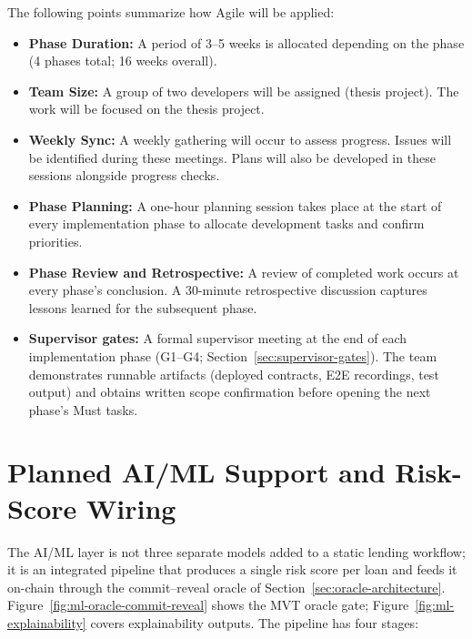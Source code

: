 \documentclass[12pt,a4paper]{report}
\begin{document}
The following points summarize how Agile will be applied:
\begin{itemize}[noitemsep]
\item \textbf{Phase Duration:} A period of 3--5 weeks is allocated depending on the phase (4 phases total; 16 weeks overall).
\item \textbf{Team Size:} A group of two developers will be assigned (thesis project). The work will be focused on the thesis project.
\item \textbf{Weekly Sync:} A weekly gathering will occur to assess progress. Issues will be identified during these meetings. Plans will also be developed in these sessions alongside progress checks.
\item \textbf{Phase Planning:} A one-hour planning session takes place at the start of every implementation phase to allocate development tasks and confirm priorities.
\item \textbf{Phase Review and Retrospective:} A review of completed work occurs at every phase's conclusion. A 30-minute retrospective discussion captures lessons learned for the subsequent phase.
\item \textbf{Supervisor gates:} A formal supervisor meeting at the end of each implementation phase (G1--G4; Section~\ref{sec:supervisor-gates}). The team demonstrates runnable artifacts (deployed contracts, E2E recordings, test output) and obtains written scope confirmation before opening the next phase's Must tasks.
\end{itemize}

\section{Planned AI/ML Support and Risk-Score Wiring}
\label{sec:aiml-support}

The AI/ML layer is not three separate models added to a static lending workflow; it is an integrated pipeline that produces a single risk score per loan and feeds it on-chain through the commit--reveal oracle of Section~\ref{sec:oracle-architecture}. Figure~\ref{fig:ml-oracle-commit-reveal} shows the MVT oracle gate; Figure~\ref{fig:ml-explainability} covers explainability outputs. The pipeline has four stages:
\end{document}
